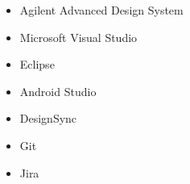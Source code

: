 \begin {itemize}
\begin {itemize}
\begin {itemize}
                            \item [-] Agilent Advanced Design System
                            \item [-] Microsoft Visual Studio
                            \item [-] Eclipse
                            \item [-] Android Studio
                            \item [-] DesignSync
                            \item [-] Git
                            \item [-] Jira
                    \end {itemize} 
         \end {itemize}      
\end {itemize} 




